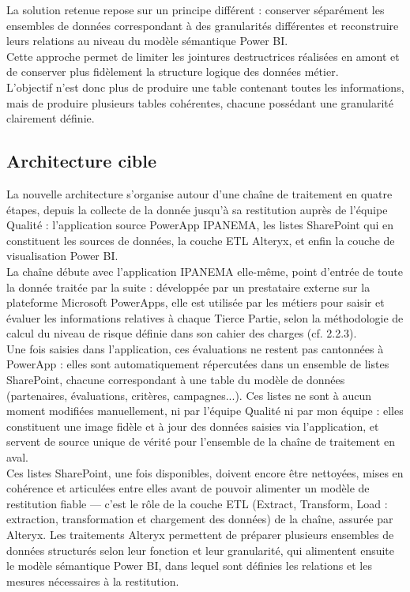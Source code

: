 La solution retenue repose sur un principe différent : conserver séparément les 
ensembles de données correspondant à des granularités différentes et reconstruire leurs 
relations au niveau du modèle sémantique Power BI. \\

Cette approche permet de limiter les jointures destructrices réalisées en amont et de 
conserver plus fidèlement la structure logique des données métier. \\

L’objectif n’est donc plus de produire une table contenant toutes les informations, mais 
de produire plusieurs tables cohérentes, chacune possédant une granularité clairement 
définie. 

\subsection{Architecture cible }


La nouvelle architecture s'organise autour d'une chaîne de traitement en quatre étapes, 
depuis la collecte de la donnée jusqu'à sa restitution auprès de l'équipe Qualité : l'application 
source PowerApp IPANEMA, les listes SharePoint qui en constituent les sources de données, 
la couche ETL Alteryx, et enfin la couche de visualisation Power BI. \\

La chaîne débute avec l'application IPANEMA elle-même, point d'entrée de toute la 
donnée traitée par la suite : développée par un prestataire externe sur la plateforme Microsoft 
PowerApps, elle est utilisée par les métiers pour saisir et évaluer les informations relatives à 
chaque Tierce Partie, selon la méthodologie de calcul du niveau de risque définie dans son 
cahier des charges (cf. 2.2.3). \\

Une fois saisies dans l'application, ces évaluations ne restent pas cantonnées à 
PowerApp : elles sont automatiquement répercutées dans un ensemble de listes SharePoint, 
chacune correspondant à une table du modèle de données (partenaires, évaluations, critères, 
campagnes...). Ces listes ne sont à aucun moment modifiées manuellement, ni par l'équipe 
Qualité ni par mon équipe : elles constituent une image fidèle et à jour des données saisies 
via l'application, et servent de source unique de vérité pour l'ensemble de la chaîne de 
traitement en aval. \\

Ces listes SharePoint, une fois disponibles, doivent encore être nettoyées, mises en 
cohérence et articulées entre elles avant de pouvoir alimenter un modèle de restitution fiable 
— c'est le rôle de la couche ETL (Extract, Transform, Load : extraction, transformation et 
chargement des données) de la chaîne, assurée par Alteryx. Les traitements Alteryx 
permettent de préparer plusieurs ensembles de données structurés selon leur fonction et leur 
granularité, qui alimentent ensuite le modèle sémantique Power BI, dans lequel sont définies 
les relations et les mesures nécessaires à la restitution. 

